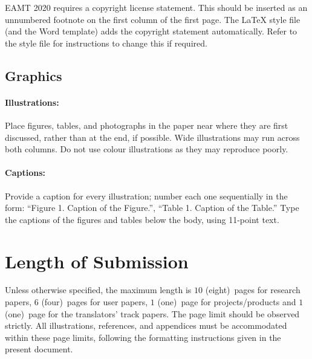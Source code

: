 \documentclass[11pt]{article}
\newcommand{\confname}{EAMT 2020}
\newcommand{\paperlength}{$10$ (eight)}
\newcommand{\shortpaperlength}{$6$ (four)}
\newcommand{\projectlength}{$1$ (one)}
\newcommand{\translatorlength}{$1$ (one)}
\begin{document}
\confname{} requires a copyright license statement. This should be inserted as
an unnumbered footnote on the first column of the first page. The \LaTeX{} style file
(and the Word template) adds the copyright statement automatically. Refer to the style file for instructions to
change this if required.

\subsection{Graphics}

\paragraph{Illustrations:} Place figures, tables, and photo\-graphs in the
paper near where they are first discussed, rather than at the end, if
possible.  Wide illustrations may run across both columns. Do not use
colour illustrations as they may reproduce poorly.

\paragraph{Captions:} Provide a caption for every illustration; number
each one sequentially in the form:  ``Figure 1. Caption of the
Figure.'', ``Table 1. Caption of the Table.''  Type the captions of
the figures and tables below the body, using 11-point text.


\section{Length of Submission}
\label{sec:length}

Unless otherwise specified, the maximum length is \paperlength~pages for research papers, \shortpaperlength~pages for user papers, \projectlength~page for projects/products and
\translatorlength~page for the translators' track papers. 
The page limit should be
observed strictly. All illustrations, references, and appendices must be
accommodated within these page limits, following the formatting instructions
given in the present document.

% 
\end{document}
